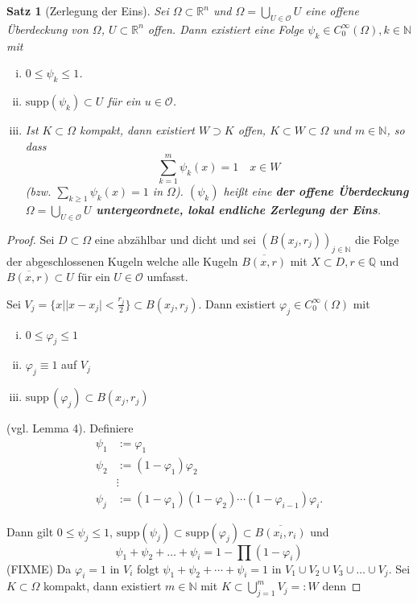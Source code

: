 \documentclass[
paper=a4,
bibtotocnumbered,
liststotocnumbered,
tablecaptionabove,
pointlessnumbers,
twoside,
openright,
10pt
]
{report}
\newcommand{\supp}{\mathrm{supp}\,}
\let\phi\varphi
\newtheorem{satz}[thm]{Satz}
\theoremstyle{definition}
\numberwithin{equation}{chapter}
\begin{document}
\begin{satz}[Zerlegung der Eins]
Sei $\Omega \subset \mathbb R^n$ und $\Omega = \bigcup_{U\in \mathcal O} U$ eine offene Überdeckung von $\Omega$, $U\subset \mathbb R^n$ offen. Dann existiert eine Folge $\psi_k \in C_0^\infty(\Omega), k \in \mathbb N$ mit
\begin{enumerate}[(i)]
\item $0 \le \psi_k\le 1$.
\item $\text{supp}(\psi_k) \subset U$ für ein $u\in \mathcal O$.
\item Ist $K\subset \Omega$ kompakt, dann existiert $W\supset K$ offen, $K\subset W\subset \Omega$ und $m\in \mathbb N$, so dass
$$
\sum_{k=1}^m \psi_k(x) =1 \quad x\in W
$$
(bzw. $\sum_{k\ge 1} \psi_k(x) =1$ in $\Omega$).  $(\psi_k)$ heißt eine \textbf{der offene Überdeckung $\Omega = \bigcup_{U\in \mathcal O} U$ untergeordnete, lokal endliche Zerlegung der Eins}.
\end{enumerate} 
\end{satz}
\begin{proof}
Sei $D\subset \Omega$ eine abzählbar und dicht und sei $(B(x_j, r_j))_{j\in \mathbb N}$ die Folge der abgeschlossenen Kugeln welche alle Kugeln $\overline{B(x, r)}$ mit $X\subset D, r\in \mathbb Q$ und $\overline{B(x,r)}\subset U$ für ein $U\in \mathcal O$ umfasst.


Sei $V_j= \{x||x-x_j|<\frac{r_j}{2}\} \subset B(x_j, r_j)$.  Dann existiert $\phi_j \in C_0^\infty(\Omega)$ mit
\begin{enumerate}[(i)]
\item $0\le \phi_j \le 1$
\item $\phi_j \equiv 1$ auf $V_j$
\item $\supp(\phi_j) \subset B(x_j, r_j)$
\end{enumerate}
(vgl. Lemma 4). Definiere
\begin{align*}
\psi_1&:= \phi_1 \\
\psi_2 &:= (1-\phi_1) \phi_2\\
&\vdots \\
\psi_j &:= (1-\phi_1)(1-\phi_2) \cdots (1- \phi_{i-1}) \phi_i.
\end{align*}

Dann gilt $0 \le \psi_j \le 1$, $\text{supp}(\psi_j) \subset \text{supp}(\phi_j) \subset \overline{B(x_i, r_i)}$ und
$$
\psi_1 + \psi_2 + \ldots + \psi_i = 1- \prod (1-\phi_i)
$$
(FIXME)
Da $\phi_i =1$ in $V_i$ folgt $\psi_1 + \psi_2 + \cdots + \psi_i =1$ in $V_1 \cup V_2 \cup V_3 \cup \ldots \cup V_j$. Sei $K\subset \Omega$ kompakt, dann existiert $m\in \mathbb N$ mit $K\subset \bigcup_{j=1}^m V_j =:W $ denn
\end{proof}
\end{document}
